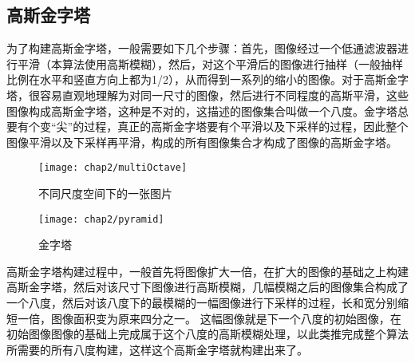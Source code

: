     \subsection{高斯金字塔}

      为了构建高斯金字塔，一般需要如下几个步骤：首先，图像经过一个低通滤波器进行平滑（本算法使用高斯模糊），然后，对这个平滑后的图像进行抽样（一般抽样比例在水平和竖直方向上都为1/2），从而得到一系列的缩小的图像。对于高斯金字塔，很容易直观地理解为对同一尺寸的图像，然后进行不同程度的高斯平滑，这些图像构成高斯金字塔，这种是不对的，这描述的图像集合叫做一个八度。金字塔总要有个变“尖”的过程，真正的高斯金字塔要有个平滑以及下采样的过程，因此整个图像平滑以及下采样再平滑，构成的所有图像集合才构成了图像的高斯金字塔。
      \begin{figure}[htp]
        \centering
        \texttt{[image: chap2/multiOctave]}
        \caption{不同尺度空间下的一张图片}
      \end{figure}
      \begin{wrapfigure}{r}{0.25\textwidth}
        \centering
        \texttt{[image: chap2/pyramid]}
        \caption{金字塔}
      \end{wrapfigure}
      高斯金字塔构建过程中，一般首先将图像扩大一倍，在扩大的图像的基础之上构建高斯金字塔，然后对该尺寸下图像进行高斯模糊，几幅模糊之后的图像集合构成了一个八度，然后对该八度下的最模糊的一幅图像进行下采样的过程，长和宽分别缩短一倍，图像面积变为原来四分之一。
      这幅图像就是下一个八度的初始图像，在初始图像图像的基础上完成属于这个八度的高斯模糊处理，以此类推完成整个算法所需要的所有八度构建，这样这个高斯金字塔就构建出来了。
